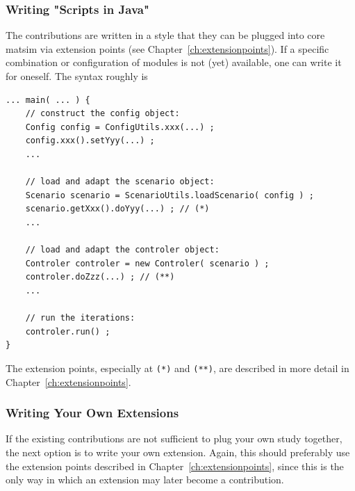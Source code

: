 \subsubsection{Writing "Scripts in Java"}
\label{sec:writing-scripts-java}
The \glspl{contribution} are written in a style that they can be plugged into core \gls{matsim} via extension points (see Chapter~\ref{ch:extensionpoints}). If a specific combination or configuration of modules is not (yet) available, one can write it for oneself. The syntax roughly is
\begin{lstlisting}
... main( ... ) {
    // construct the config object:
    Config config = ConfigUtils.xxx(...) ;
    config.xxx().setYyy(...) ;
    ...

    // load and adapt the scenario object:
    Scenario scenario = ScenarioUtils.loadScenario( config ) ;
    scenario.getXxx().doYyy(...) ; // (*)
    ...

    // load and adapt the controler object:
    Controler controler = new Controler( scenario ) ;
    controler.doZzz(...) ; // (**)
    ...

    // run the iterations:
    controler.run() ;
}
\end{lstlisting}
The extension points, especially at \lstinline{(*)} and \lstinline{(**)}, are described in more detail in Chapter~\ref{ch:extensionpoints}.

\subsubsection{Writing Your Own Extensions}
\label{sec:writing-your-own-extensions}
If the existing \glspl{contribution} are not sufficient to plug your own study together, the next option is to write your own \gls{extension}.  Again, this should preferably use the extension points described in Chapter~\ref{ch:extensionpoints}, since this is the only way in which an \gls{extension} may later become a \gls{contribution}.  



